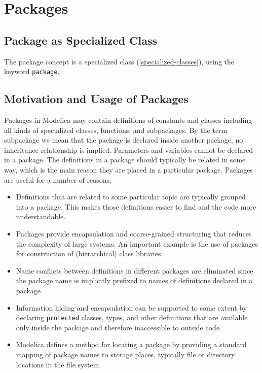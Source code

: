 \chapter{Packages}

\section{Package as Specialized Class}

The package concept is a specialized class (\autoref{specialized-classes}), using the
keyword \lstinline!package!.

\section{Motivation and Usage of Packages}

\begin{nonnormative}
Packages in Modelica may contain definitions of constants and
classes including all kinds of specialized classes, functions, and
subpackages. By the term subpackage we mean that the package is declared
inside another package, no inheritance relationship is implied.
Parameters and variables cannot be declared in a package. The
definitions in a package should typically be related in some way, which
is the main reason they are placed in a particular package. Packages are
useful for a number of reasons:
\begin{itemize}
\item
  Definitions that are related to some particular topic are typically
  grouped into a package. This makes those definitions easier to find
  and the code more understandable.
\item
  Packages provide encapsulation and coarse-grained structuring
  that reduces the complexity of large systems. An important example is
  the use of packages for construction of (hierarchical) class
  libraries.
\item
  Name conflicts between definitions in different packages are
  eliminated since the package name is implicitly prefixed to names of
  definitions declared in a package.
\item
  Information hiding and encapsulation can be supported to some
  extent by declaring \lstinline!protected! classes, types, and other
  definitions that are available only inside the package and therefore
  inaccessible to outside code.
\item
  Modelica defines a method for locating a package by providing a
  standard mapping of package names to storage places, typically file or
  directory locations in the file system.
\end{itemize}
\end{nonnormative}


